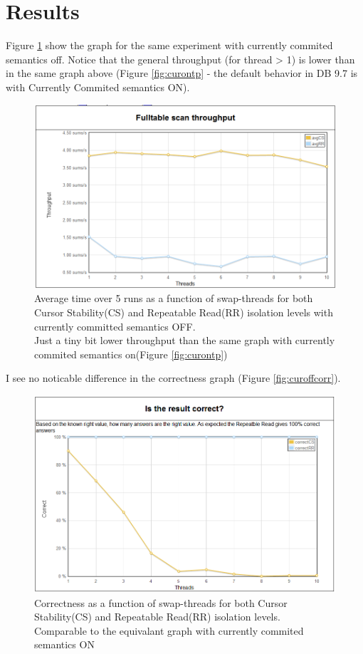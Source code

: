 \section{Results}
Figure \ref{fig:curofftp} show the graph for the same experiment with currently
commited semantics off. Notice that the general throughput (for thread > 1) is
lower than in the same graph above (Figure \ref{fig:curontp} - the default
behavior in DB 9.7 is with Currently Commited semantics ON).

\begin{figure}
  \centering
  \includegraphics[width=12cm]{assignment1/curoff_tp}
  \caption[Average time over 5 runs - new script, currently commited semantics
  off]{Average time over 5 runs as a function of
  swap-threads for both Cursor Stability(CS) and Repeatable Read(RR) isolation
  levels with currently committed semantics OFF.\\
  Just a tiny bit lower throughput than the same graph with currently commited
  semantics on(Figure \ref{fig:curontp})}\label{fig:curofftp}
\end{figure}

I see no noticable difference in the correctness graph (Figure
\ref{fig:curoffcorr}).

\begin{figure}
  \centering
  \includegraphics[width=12cm]{assignment1/curon_corr}
  \caption[Correctness - new script,currently commited semantics off
  ]{Correctness as a function of
  swap-threads for both Cursor Stability(CS) and Repeatable Read(RR) isolation
  levels.\\ Comparable to the equivalant graph with currently commited
  semantics ON }\label{fig:curoncorr}
\end{figure}


